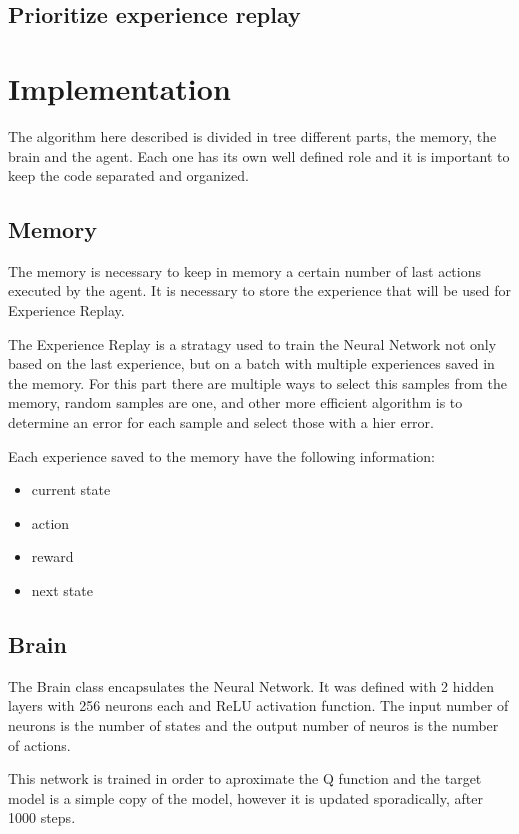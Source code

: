 \documentclass{article}
\begin{document}
\subsection{Prioritize experience replay}

\section{Implementation}
The algorithm here described is divided in tree different parts, the memory, the brain and the agent. Each one has its own well defined role and it is important to keep the code separated and organized.

\subsection{Memory}
The memory is necessary to keep in memory a certain number of last actions executed by the agent. It is necessary to store the experience that will be used for Experience Replay.

The Experience Replay is a stratagy used to train the Neural Network not only based on the last experience, but on a batch with multiple experiences saved in the memory. For this part there are multiple ways to select this samples from the memory, random samples are one, and other more efficient algorithm is to determine an error for each sample and select those with a hier error.

Each experience saved to the memory have the following information:

\begin{itemize}
	\item current state
	\item action
	\item reward
	\item next state
\end{itemize}

\subsection{Brain}
The Brain class encapsulates the Neural Network. It was defined with 2 hidden layers with 256 neurons each and ReLU activation function. The input number of neurons is the number of states and the output number of neuros is the number of actions.

This network is trained in order to aproximate the Q function and the target model is a simple copy of the model, however it is updated sporadically, after 1000 steps.
\end{document}
